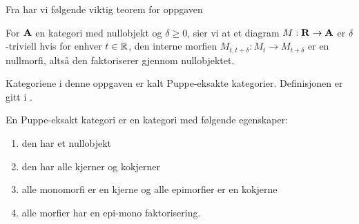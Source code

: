 Fra \citep[definisjon 1.3]{Bauer2018} har vi følgende
viktig teorem for oppgaven

\begin{definisjon}\label{def:trivialitet}
   For $\textnormal{\textbf{{A}}}$ en kategori med nullobjekt og
   $\delta\geq0$, sier vi at et diagram $M:\textnormal{\textbf{{R}}}\to\textnormal{\textbf{{A}}}$
   er $\delta$-triviell hvis for enhver $t\in\mathbb{R}$, den
   interne morfien $M_{t,t+\delta}: M_t\to M_{t+\delta}$
   er en nullmorfi, altså den faktoriserer gjennom
   nullobjektet.
\end{definisjon}

Kategoriene i denne oppgaven er kalt Puppe-eksakte
kategorier. Definisjonen er gitt i \citep[definisjon
2.1]{Bauer2018}.

\begin{definisjon}\label{def:Puppe-eksakt}
   En Puppe-eksakt kategori er en kategori med følgende
   egenskaper:
  \begin{enumerate}
    \item den har et nullobjekt
    \item den har alle kjerner og kokjerner
    \item alle monomorfi er en kjerne og alle epimorfier
      er en kokjerne
    \item alle morfier har en epi-mono faktorisering.
  \end{enumerate}
\end{definisjon}


